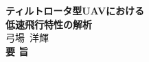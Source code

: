 
\begin{titlepage}
\begin{center}
{\LARGE \bf ティルトロータ型UAVにおける\\低速飛行特性の解析}
\\[0.5cm]
{\Large 弓場~洋輝}
\\[1.0cm]
{\LARGE \bf 要\vspace{36pt}   旨\\}
\end{center}


\end{titlepage}

